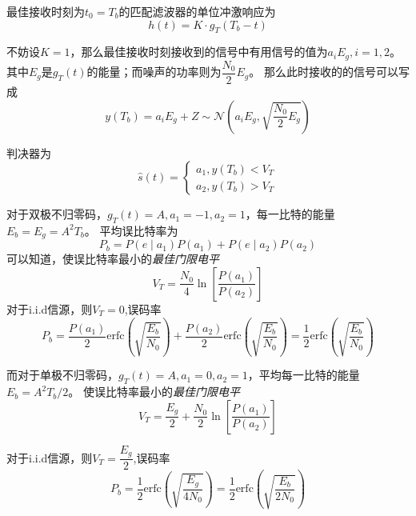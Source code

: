     最佳接收时刻为$t_0=T_b$的匹配滤波器的单位冲激响应为
    \begin{equation}
        h(t)=K\cdot g_T(T_b-t) 
    \end{equation}

    不妨设$K=1$，那么最佳接收时刻接收到的信号中有用信号的值为$a_iE_g,i=1,2$。
    其中$E_g$是$g_T(t)$的能量；而噪声的功率则为$\dfrac{N_0}{2}E_g$。
    那么此时接收的的信号可以写成
    \begin{equation}
        y(T_b)=a_iE_g+Z\sim\mathscr{N}\left(a_iE_g,\sqrt{\frac{N_0}{2}E_g}\right)
    \end{equation}

    判决器为
    \vspace{-2ex}
    \begin{equation}
        \hat{s}(t)=\begin{cases}
            a_1,y(T_b)<V_T\\
            a_2,y(T_b)>V_T
        \end{cases}
    \end{equation}

    对于双极不归零码，$g_T(t)=A,a_1=-1,a_2=1$，每一比特的能量$E_b=E_g=A^2T_b$。
    平均误比特率为
    \begin{equation}
        P_b=P\left(e\mid a_1\right)P(a_1)+P\left(e\mid a_2\right)P(a_2)
    \end{equation}
    可以知道，使误比特率最小的\emph{最佳门限电平}
    \begin{equation}
        V_T=\frac{N_0}{4}\ln\left[\frac{P(a_1)}{P(a_2)}\right]
    \end{equation}
    对于i.i.d信源，则$V_T=0$,误码率
    \begin{equation}\label{eq:BERofBNRZ}
        P_b=\frac{P(a_1)}{2}\text{erfc}\left(\sqrt{\frac{E_b}{N_0}}\right)+\frac{P(a_2)}{2}\text{erfc}\left(\sqrt{\frac{E_b}{N_0}}\right)=\frac{1}{2}\text{erfc}\left(\sqrt{\frac{E_b}{N_0}}\right)
    \end{equation}

    而对于单极不归零码，$g_T(t)=A,a_1=0,a_2=1$，平均每一比特的能量$E_b=A^2T_b/2$。
    使误比特率最小的\emph{最佳门限电平}
    \begin{equation}
        V_T=\frac{E_g}{2}+\frac{N_0}{2}\ln\left[\frac{P(a_1)}{P(a_2)}\right]
    \end{equation}

    对于i.i.d信源，则$V_T=\dfrac{E_g}{2}$,误码率
    \begin{equation}
        P_b=\frac{1}{2}\text{erfc}\left(\sqrt{\frac{E_g}{4N_0}}\right)=\frac{1}{2}\text{erfc}\left(\sqrt{\frac{E_b}{2N_0}}\right)
    \end{equation}

